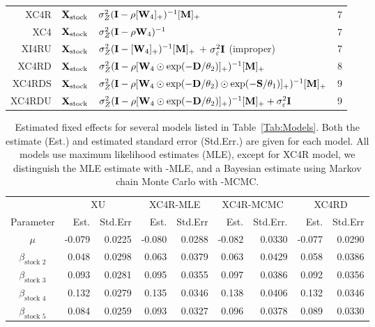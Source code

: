\documentclass[11pt, titlepage]{article}\usepackage[]{graphicx}\usepackage[]{color}
\begin{document}
\begin{spacing}{1.9}
\begin{flushleft}
\begin{table}[ht]
\begin{center}
\begin{tabular}{r|l|l|c}
  XC4R & $\mathbf{X}_{\textrm{stock}}$ & $\sigma_Z^2(\mathbf{I} - \rho[\mathbf{W}_4]_+)^{-1}[\mathbf{M}]_+$ & 7 \\
  XC4 & $\mathbf{X}_{\textrm{stock}}$ & $\sigma_Z^2(\mathbf{I} - \rho\mathbf{W}_{4})^{-1}$ & 7 \\
	XI4RU & $\mathbf{X}_{\textrm{stock}}$ & $\sigma_Z^2(\mathbf{I} - [\mathbf{W}_4]_+)^{-1}[\mathbf{M}]_+$ + $\sigma_\varepsilon^2\mathbf{I}$ (\textrm{improper}) & 7 \\
  XC4RD & $\mathbf{X}_{\textrm{stock}}$ & $\sigma_Z^2(\mathbf{I} - \rho[\mathbf{W}_{4}\odot\exp(-\mathbf{D}/\theta_2)]_{+})^{-1}[\mathbf{M}]_+$ & 8 \\
  XC4RDS & $\mathbf{X}_{\textrm{stock}}$ & $\sigma_Z^2(\mathbf{I} - \rho[\mathbf{W}_{4}\odot\exp(-\mathbf{D}/\theta_2)\odot\exp(-\mathbf{S}/\theta_1)]_{+})^{-1}[\mathbf{M}]_+$ & 9 \\
  XC4RDU & $\mathbf{X}_{\textrm{stock}}$ & $\sigma_Z^2(\mathbf{I} - \rho[\mathbf{W}_{4}\odot\exp(-\mathbf{D}/\theta_2)]_{+})^{-1}[\mathbf{M}]_+ + \sigma^2_\varepsilon\mathbf{I}$ & 9 \\
   \hline
\end{tabular}
\end{center}
\end{table}




\newpage
\begin{table}[ht]
				\caption{Estimated fixed effects for several models listed in Table~\ref{Tab:Models}. Both the estimate (Est.) and estimated standard error (Std.Err.) are given for each model. All models use maximum likelihood estimates (MLE), except for XC4R model, we distinguish the MLE estimate with -MLE, and a Bayesian estimate using Markov chain Monte Carlo with -MCMC.  \label{Tab:Coeff}}
\begin{center}
\begin{tabular}{c|rr|rr|rr|rr}
  \hline
  \hline
  & \multicolumn{2}{|c|}{XU} & \multicolumn{2}{|c|}{XC4R-MLE}  
  & \multicolumn{2}{|c|}{XC4R-MCMC} & \multicolumn{2}{|c}{XC4RD} \\
  Parameter & Est. & Std.Err & Est. & Std.Err & Est. & Std.Err. & Est. & Std.Err \\
  \hline
$\mu$ & -0.079 & 0.0225 & -0.080 & 0.0288 & -0.082 & 0.0330 & -0.077 & 0.0290 \\ 
  $\beta_{\textrm{stock 2}}$ & 0.048 & 0.0298 & 0.063 & 0.0379 & 0.063 & 0.0429 & 0.058 & 0.0386 \\ 
  $\beta_{\textrm{stock 3}}$ & 0.093 & 0.0281 & 0.095 & 0.0355 & 0.097 & 0.0386 & 0.092 & 0.0356 \\ 
  $\beta_{\textrm{stock 4}}$ & 0.132 & 0.0279 & 0.135 & 0.0346 & 0.138 & 0.0406 & 0.132 & 0.0346 \\ 
  $\beta_{\textrm{stock 5}}$ & 0.084 & 0.0259 & 0.093 & 0.0327 & 0.096 & 0.0378 & 0.089 & 0.0330 \\ 
   \hline


\end{tabular}
\end{center}
\end{table}
\end{flushleft}
\end{spacing}
\end{document}
